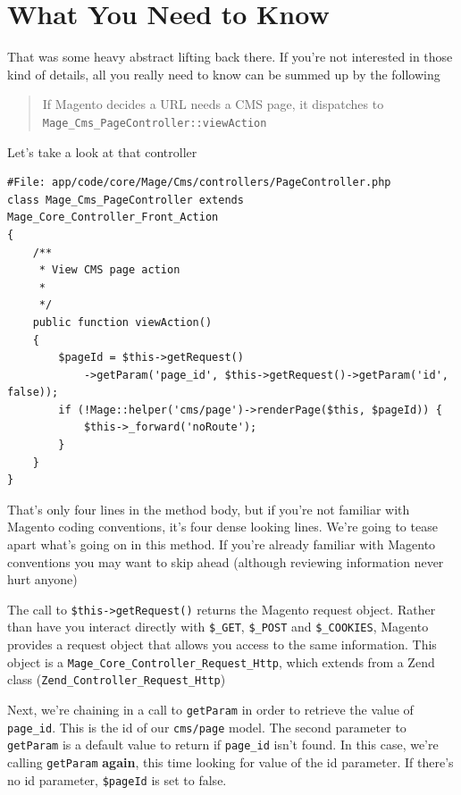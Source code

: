 \documentclass[oneside]{book}
\begin{document}
\section{What You \textbf{Need} to Know}

That was some heavy abstract lifting back there.  If you're not interested in those kind of details, all you really need to know can be summed up by the following

\begin{quote}
If Magento decides a URL needs a CMS page, it dispatches to \footnotesize\texttt{Mage\_Cms\_PageController::viewAction} \normalsize
\end{quote}

Let's take a look at that controller

\begin{lstlisting}
#File: app/code/core/Mage/Cms/controllers/PageController.php
class Mage_Cms_PageController extends Mage_Core_Controller_Front_Action
{
    /**
     * View CMS page action
     *
     */
    public function viewAction()
    {
        $pageId = $this->getRequest()
            ->getParam('page_id', $this->getRequest()->getParam('id', false));
        if (!Mage::helper('cms/page')->renderPage($this, $pageId)) {
            $this->_forward('noRoute');
        }
    }
}

\end{lstlisting}


That's only four lines in the method body, but if you're not familiar with Magento coding conventions, it's four dense looking lines.  We're going to tease apart what's going on in this method. If you're already familiar with Magento conventions you may want to skip ahead (although reviewing information never hurt anyone)

The call to \footnotesize\texttt{\$this-\textgreater getRequest()} \normalsize  returns the Magento request object.  Rather than have you interact directly with \footnotesize\texttt{\$\_GET}\normalsize, \footnotesize\texttt{\$\_POST} \normalsize  and \footnotesize\texttt{\$\_COOKIES}\normalsize, Magento provides a request object that allows you access to the same information.  This object is a \footnotesize\texttt{Mage\_Core\_Controller\_Request\_Http}\normalsize, which extends from a Zend class (\footnotesize\texttt{Zend\_Controller\_Request\_Http}\normalsize)

Next, we're chaining in a call to \footnotesize\texttt{getParam} \normalsize  in order to retrieve the value of \footnotesize\texttt{page\_id}\normalsize.  This is the id of our \footnotesize\texttt{cms/page} \normalsize  model.  The second parameter to \footnotesize\texttt{getParam} \normalsize  is a default value to return if \footnotesize\texttt{page\_id} \normalsize  isn't found.  In this case, we're calling \footnotesize\texttt{getParam} \normalsize  \textbf{again}, this time looking for value of the id parameter.  If there's no id parameter, \footnotesize\texttt{\$pageId} \normalsize  is set to false.
\end{document}
